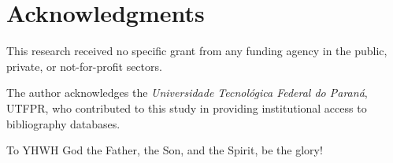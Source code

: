 \section*{Acknowledgments}

    This research received no specific grant from any funding agency in the public, private,  or
    not-for-profit sectors.

    The author acknowledges the \textit{Universidade Tecnológica Federal do Paraná}, UTFPR,  who
    contributed to this study in providing institutional access to bibliography databases.

    To YHWH God the Father, the Son, and the Spirit, be the glory!



